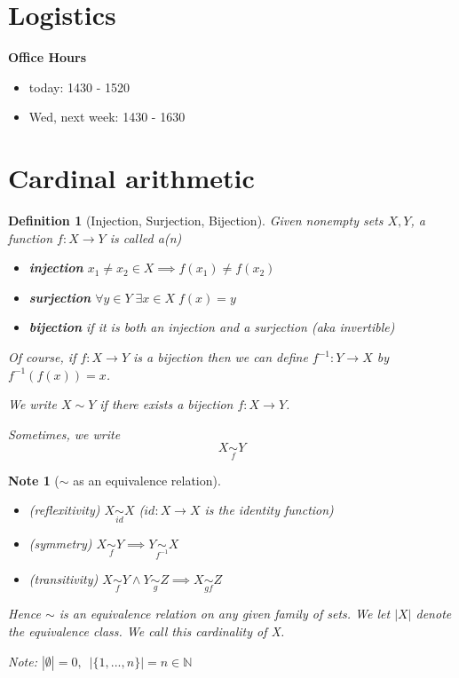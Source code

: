 \documentclass[11pt, oneside]{book}
\theoremstyle{break}
\newtheorem*{note}{Note}
\newtheorem{defn}{Definition}[section]
\newcommand{\bb}[1]{\mathbb{#1}}			%
\begin{document}
\section{Logistics}

\textbf{Office Hours}
\begin{itemize}
	\item today: 1430 - 1520
	\item Wed, next week: 1430 - 1630
\end{itemize}

\section{Cardinal arithmetic}\label{sect:cardinal_arith}

\begin{defn}[Injection, Surjection, Bijection]
	Given nonempty sets $X, Y$, a function $f: X \to Y$ is called a(n)
	\begin{itemize}
		\item \textbf{injection} $x_1 \neq x_2 \in X \implies f(x_1) \neq f(x_2)$
		\item \textbf{surjection} $\forall y \in Y \; \exists x \in X \; f(x) = y$
		\item \textbf{bijection} if it is both an injection and a surjection (aka invertible)
	\end{itemize}	
	Of course, if $f: X \to Y$ is a bijection then we can define $f^{-1} : Y \to X$ by $f^{-1}(f(x)) = x$.

	We write $X \sim Y$ if there exists a bijection $f: X \to Y$.

	Sometimes, we write
	\begin{equation*}
		X \underset{f}{\sim} Y
	\end{equation*}
\end{defn}

\begin{note}[$\sim$ as an equivalence relation]
	\begin{itemize}
		\item (reflexitivity) $X \underset{id}{\sim} X$ ($id: X \to X$ is the identity function)

		\item (symmetry) $X \underset{f}{\sim} Y \implies Y \underset{f^{-1}}{\sim} X$

		\item (transitivity) $X \underset{f}{\sim} Y \land Y \underset{g}{\sim} Z \implies X \underset{gf}{\sim} Z$
	\end{itemize}

	Hence $\sim$ is an equivalence relation on any given family of sets. We let $|X|$ denote the equivalence class. We call this \textit{cardinality} of X.

	Note: $|\emptyset| = 0, \enspace |\{1, ..., n\}| = n \in \bb{N}$
\end{note}
\end{document}
